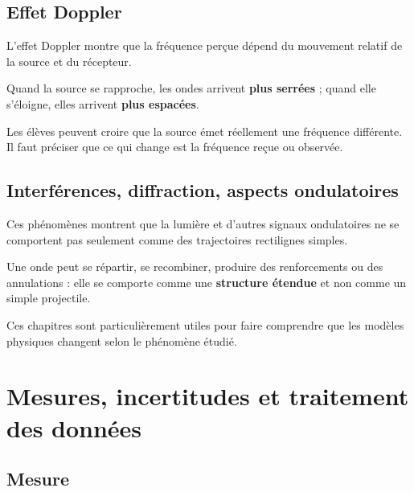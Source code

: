 \documentclass[11pt,a4paper]{article}
\begin{document}
\subsection{Effet Doppler}

\begin{sens}
L'effet Doppler montre que la fréquence perçue dépend du mouvement relatif de la source et du récepteur.
\end{sens}

\begin{imagem}
Quand la source se rapproche, les ondes arrivent \textbf{plus serrées} ;
quand elle s'éloigne, elles arrivent \textbf{plus espacées}.
\end{imagem}

\begin{fausseintuition}
Les élèves peuvent croire que la source émet réellement une fréquence différente.
Il faut préciser que ce qui change est la fréquence reçue ou observée.
\end{fausseintuition}

\subsection{Interférences, diffraction, aspects ondulatoires}

\begin{sens}
Ces phénomènes montrent que la lumière et d'autres signaux ondulatoires
ne se comportent pas seulement comme des trajectoires rectilignes simples.
\end{sens}

\begin{imagem}
Une onde peut se répartir, se recombiner, produire des renforcements ou des annulations :
elle se comporte comme une \textbf{structure étendue} et non comme un simple projectile.
\end{imagem}

\begin{idee}
Ces chapitres sont particulièrement utiles pour faire comprendre que les modèles physiques changent selon le phénomène étudié.
\end{idee}

\newpage

\section{Mesures, incertitudes et traitement des données}

\subsection{Mesure}
\end{document}
